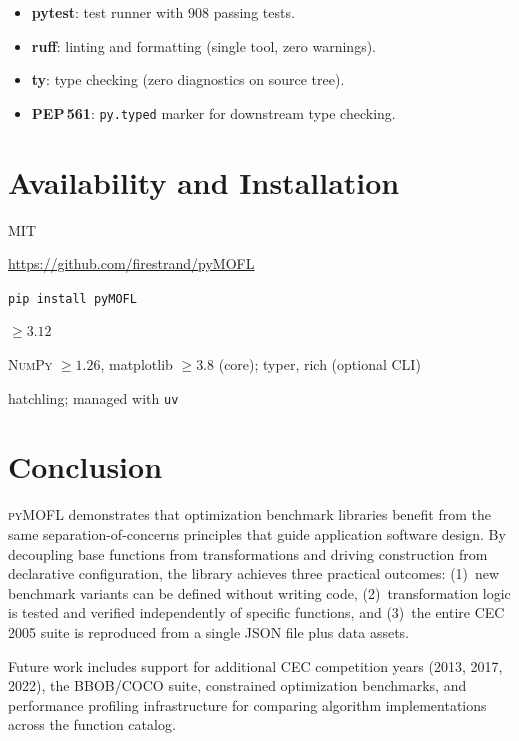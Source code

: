\documentclass[11pt,a4paper]{article}
\newcommand{\pymofl}{\textsc{pyMOFL}}
\newcommand{\numpy}{\textsc{NumPy}}
\begin{document}
\begin{itemize}[nosep]
  \item \textbf{pytest}: test runner with 908 passing tests.
  \item \textbf{ruff}: linting and formatting (single tool, zero warnings).
  \item \textbf{ty}: type checking (zero diagnostics on source tree).
  \item \textbf{PEP\,561}: \texttt{py.typed} marker for downstream type checking.
\end{itemize}

\section{Availability and Installation}\label{sec:availability}

\begin{description}[nosep,leftmargin=1em]
  \item[License:] MIT
  \item[Repository:] \url{https://github.com/firestrand/pyMOFL}
  \item[PyPI:] \texttt{pip install pyMOFL}
  \item[Python:] $\geq 3.12$
  \item[Dependencies:] \numpy{} $\geq 1.26$, matplotlib $\geq 3.8$ (core);
    typer, rich (optional CLI)
  \item[Build system:] hatchling; managed with \texttt{uv}
\end{description}

\section{Conclusion}\label{sec:conclusion}

\pymofl{} demonstrates that optimization benchmark libraries benefit from the
same separation-of-concerns principles that guide application software design.
By decoupling base functions from transformations and driving construction from
declarative configuration, the library achieves three practical outcomes:
(1)~new benchmark variants can be defined without writing code,
(2)~transformation logic is tested and verified independently of specific
functions, and (3)~the entire CEC\,2005 suite is reproduced from a single
JSON file plus data assets.

Future work includes support for additional CEC competition years
(2013, 2017, 2022), the BBOB/COCO suite, constrained optimization benchmarks,
and performance profiling infrastructure for comparing algorithm
implementations across the function catalog.
\end{document}
